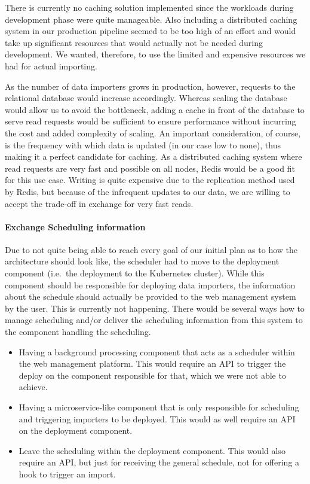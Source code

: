 There is currently no caching solution implemented since the workloads
during development phase were quite manageable. Also including a
distributed caching system in our production pipeline seemed to be too
high of an effort and would take up significant resources that would
actually not be needed during development. We wanted, therefore, to use
the limited and expensive resources we had for actual importing.

As the number of data importers grows in production, however, requests
to the relational database would increase accordingly. Whereas scaling
the database would allow us to avoid the bottleneck, adding a cache in
front of the database to serve read requests would be sufficient to
ensure performance without incurring the cost and added complexity of
scaling. An important consideration, of course, is the frequency with
which data is updated (in our case low to none), thus making it a
perfect candidate for caching. As a distributed caching system where
read requests are very fast and possible on all nodes, Redis would be a
good fit for this use case. Writing is quite expensive due to the
replication method used by Redis, but because of the infrequent updates
to our data, we are willing to accept the trade-off in exchange for very
fast reads.

\paragraph{Exchange Scheduling information}

Due to not quite being able to reach every goal of our initial plan as
to how the architecture should look like, the scheduler had to move to
the deployment component (i.e.~the deployment to the Kubernetes
cluster). While this component should be responsible for deploying data
importers, the information about the schedule should actually be
provided to the web management system by the user. This is currently not
happening. There would be several ways how to manage scheduling and/or
deliver the scheduling information from this system to the component
handling the scheduling.

\begin{itemize}
\tightlist
\item
  Having a background processing component that acts as a scheduler
  within the web management platform. This would require an API to
  trigger the deploy on the component responsible for that, which we
  were not able to achieve.
\item
  Having a microservice-like component that is only responsible for
  scheduling and triggering importers to be deployed. This would as well
  require an API on the deployment component.
\item
  Leave the scheduling within the deployment component. This would also
  require an API, but just for receiving the general schedule, not for
  offering a hook to trigger an import.
\end{itemize}

